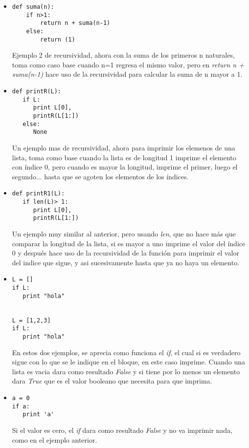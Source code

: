 \documentclass[letterpaper, 12pt,oneside]{article}
\begin{document}
\begin{enumerate}
\begin{itemize}
				
				\item \begin{lstlisting}
def suma(n):
    if n>1:
        return n + suma(n-1)
    else:
        return (1)
				\end{lstlisting} Ejemplo 2 de recursividad, ahora con la suma de los primeros n naturales, toma como caso base cuando n=1 regresa el mismo valor, pero en \textit{return n + suma(n-1)} hace uso de la recursividad para calcular la suma de n mayor a 1.\\
				
				\item \begin{lstlisting}
def printR(L):
   if L:
      print L[0],
      printR(L[1:])
   else:
      None
				\end{lstlisting} Un ejemplo mas de recursividad, ahora para imprimir los elemenos de una lista, toma como base cuando la lista es de longitud 1 imprime el elemento con índice 0, pero cuando es mayor la longitud, imprime el primer, luego el segundo... hasta que se agoten los elementos de los índices.\\
				
				
				\item \begin{lstlisting}
def printR1(L):
   if len(L)> 1:
      print L[0],
      printR(L[1:])
				\end{lstlisting} Un ejemplo muy similar al anterior, pero usando \textit{len}, que no hace más que comparar la longitud de la lista, si es mayor a uno imprime el valor del índice 0 y después hace uso de la recursividad de la función para imprimir el valor del indice que sigue, y asi sucesivamente hasta que ya no haya un elemento.\\
			
					
				\item \begin{lstlisting}
L = []
if L:
   print "hola"
   
   
L = [1,2,3]
if L:
   print "hola"   
				\end{lstlisting} En estos dos ejemplos, se aprecia como funciona el \textit{if}, el cual si es verdadero sigue con lo que se le indique en el bloque, en este caso imprime. Cuando una lista es vacia dara como resultado \textit{False} y si tiene por lo menos un elemento dara \textit{True} que es el valor booleano que necesita para que imprima.\\
				\item \begin{lstlisting}
a = 0 
if a: 
   print 'a'
				\end{lstlisting} Si el valor es cero, el \textit{if} dara como resultado \textit{False} y no va imprimir nada, como en el ejemplo anterior. 
			
				
				
			\end{itemize}
		
		
		
			
			
		
		
	\end{enumerate}
	
	
	
	
	
	
	
	
	
	
	
\end{document}
